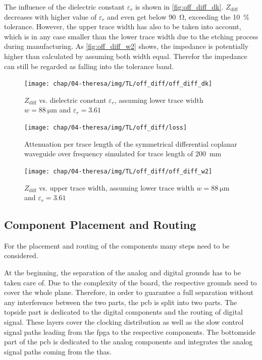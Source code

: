 The influence of the dielectric constant $\varepsilon_r$ is shown in \autoref{fig:off_diff_dk}. 
$Z_\text{diff}$ decreases with higher value of $\varepsilon_r$ and even get below \SI{90}{\ohm}, exceeding the \SI{10}{\percent} tolerance.
However, the upper trace width has also to be taken into account, which is in any case smaller than the lower trace width due to the etching process during manufacturing.
As \autoref{fig:off_diff_w2} shows, the impedance is potentially higher than calculated by assuming both width equal. Therefor the impedance can still be regarded as falling into the tolerance band.
\begin{figure}[tb]
	\centering
	\texttt{[image: chap/04-theresa/img/TL/off\_diff/off\_diff\_dk]}
	\caption[DOWG, $Z_\text{diff}$ vs. $\varepsilon_r$]{$Z_\text{diff}$ vs. dielectric constant $\varepsilon_r$, assuming lower trace width $w = \SI{88}{\micro \meter}$ and $\varepsilon_r = 3.61$}
	\label{fig:off_diff_dk}
\end{figure}


\begin{figure}[tb]
	\centering
	\texttt{[image: chap/04-theresa/img/TL/off\_diff/loss]}
	\caption[DOWG]{Attenuation per trace length of the symmetrical differential coplanar waveguide over frequency simulated for trace length of \SI{200}{\mm}}
	\label{fig:off_diff_loss}
\end{figure}



\begin{figure}[tb]
	\centering
	\texttt{[image: chap/04-theresa/img/TL/off\_diff/off\_diff\_w2]}
	\caption[DOWG, $Z_\text{diff}$ vs. upper trace width]{$Z_\text{diff}$ vs. upper trace width, assuming lower trace width $w = \SI{88}{\micro \meter}$ and $\varepsilon_r = 3.61$}
	\label{fig:off_diff_w2}
\end{figure}



\subsection{Component Placement and Routing}
For the placement and routing of the components many steps need to be considered.

At the beginning, the separation of the analog and digital grounds has to be taken care of. 
Due to the complexity of the board, the respective grounds need to cover the whole plane. 
Therefore, in order to guarantee a full separation without any interference between the two parts, the \gls{pcb} is split into two parts.
The topside part is dedicated to the digital components and the routing of digital signal. 
These layers cover the clocking distribution as well as the slow control signal paths leading from the \gls{fpga} to the respective components.
The bottomside part of the \gls{pcb} is dedicated to the analog components and integrates the analog signal paths coming from the \glspl{tha}.

